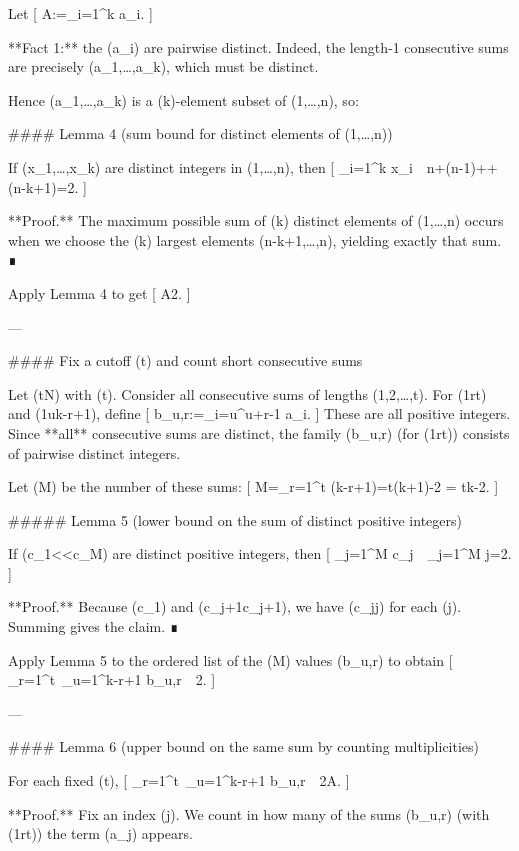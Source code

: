 Let
[
A:=\sum_{i=1}^k a_i.
]

**Fact 1:** the (a_i) are pairwise distinct.
Indeed, the length‑1 consecutive sums are precisely (a_1,\dots,a_k), which must be distinct.

Hence ({a_1,\dots,a_k}) is a (k)-element subset of ({1,\dots,n}), so:

#### Lemma 4 (sum bound for distinct elements of ({1,\dots,n}))

If (x_1,\dots,x_k) are distinct integers in ({1,\dots,n}), then
[
\sum_{i=1}^k x_i\ \le\ n+(n-1)+\cdots+(n-k+1)=2.
]

**Proof.**
The maximum possible sum of (k) distinct elements of ({1,\dots,n}) occurs when we choose the (k) largest elements (n-k+1,\dots,n), yielding exactly that sum. ∎

Apply Lemma 4 to get
[
A\le {}2. 
]

---

#### Fix a cutoff (t) and count short consecutive sums

Let (t\in\mathbb N) with (t). Consider all consecutive sums of lengths (1,2,\dots,t). For (1\le r\le t) and (1\le u\le k-r+1), define
[
b_{u,r}:=\sum_{i=u}^{u+r-1} a_i.
]
These are all positive integers. Since **all** consecutive sums are distinct, the family ({b_{u,r}}) (for (1\le r\le t)) consists of pairwise distinct integers.

Let (M) be the number of these sums:
[
M=\sum_{r=1}^{t} (k-r+1)=t(k+1)-2
= tk-2. 
]

##### Lemma 5 (lower bound on the sum of distinct positive integers)

If (c_1<\cdots<c_M) are distinct positive integers, then
[
\sum_{j=1}^M c_j\ \ge\ \sum_{j=1}^M j=2.
]

**Proof.**
Because (c_1) and (c_{j+1}\ge c_j+1), we have (c_j\ge j) for each (j). Summing gives the claim. ∎

Apply Lemma 5 to the ordered list of the (M) values (b_{u,r}) to obtain
[
\sum_{r=1}^t\ \sum_{u=1}^{k-r+1} b_{u,r}\ \ge\ 2. 
]

---

#### Lemma 6 (upper bound on the same sum by counting multiplicities)

For each fixed (t),
[
\sum_{r=1}^t\ \sum_{u=1}^{k-r+1} b_{u,r}\ \le\ 2\cdot A.
]

**Proof.**
Fix an index (j). We count in how many of the sums (b_{u,r}) (with (1\le r\le t)) the term (a_j) appears.

